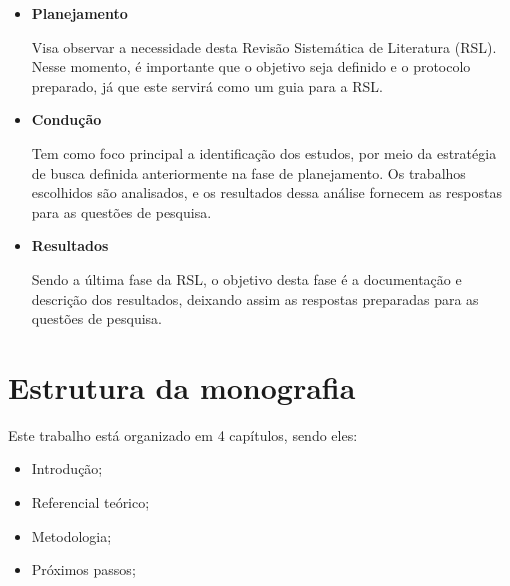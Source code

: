 \begin{itemize}
	\item \textbf{Planejamento}
	
	Visa observar a necessidade desta Revisão Sistemática de Literatura (RSL). Nesse momento, é importante que o objetivo seja definido e o protocolo preparado, já que este servirá como um guia para a RSL.
	
	\item \textbf{Condução}
	
	Tem como foco principal a identificação dos estudos, por meio da estratégia de busca definida anteriormente na fase de planejamento. Os trabalhos escolhidos são analisados, e os resultados dessa análise fornecem as respostas para as questões de pesquisa.
	
	\item \textbf{Resultados}
	
	Sendo a última fase da RSL, o objetivo desta fase é a documentação e descrição dos resultados, deixando assim as respostas preparadas para as questões de pesquisa.
\end{itemize}

\section{Estrutura da monografia}

Este trabalho está organizado em 4 capítulos, sendo eles:

\begin{itemize}
	\item Introdução;
	
	\item Referencial teórico;
	
	\item Metodologia;
	
	\item Próximos passos;
\end{itemize}
